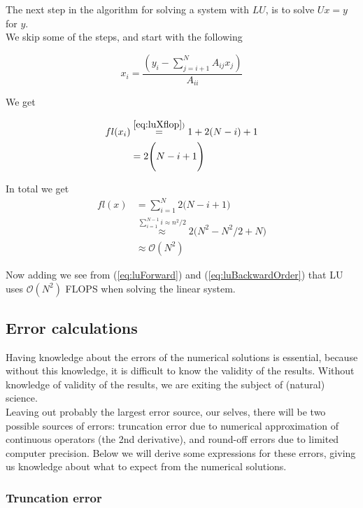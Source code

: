 \documentclass{article}
\begin{document}
The next step in the algorithm for solving a system with $LU$, is to solve $Ux = y$ for $y$.\\

We skip some of the steps, and start with the following

\begin{equation}\label{eq:luXflop}
x_i = \frac{(y_i - \sum_{j=i+1}^N A_{ij} x_j)}{A_{ii}}
\end{equation}

We get

\begin{align}
fl(x_i) & \stackrel{\ref{eq:luXflop})}{=} 1 + 2(N - i) + 1 \\
&= 2\Bigg(N-i + 1 \Bigg)
\end{align}

In total we get
\begin{subequations}
	\begin{align}
	fl(x) &= \sum_{i=1}^N 2\Bigg(N-i + 1 \Bigg)\\
	&\stackrel{\sum_{i=1}^{N-1} i\approx n^2/2}{\approx} 2 \Bigg( N^2 - N^2/2 + N\Bigg)\\
	&\approx \mathcal{O}(N^2)\label{eq:luBackwardOrder}
	\end{align}
\end{subequations}

Now adding we see from (\ref{eq:luForward}) and (\ref{eq:luBackwardOrder}) that LU uses $\mathcal{O}(N^2)$ FLOPS when solving the linear system.

\subsection{Error calculations}
Having knowledge about the errors of the numerical solutions is essential, because without this knowledge, it is difficult to know the validity of the results. Without knowledge of validity of the results, we are exiting the subject of (natural) science. \\

Leaving out probably the largest error source, our selves, there will be two possible sources of errors: truncation error due to numerical approximation of continuous operators (the 2nd derivative), and round-off errors due to limited computer precision. Below we will derive some expressions for these errors, giving us knowledge about what to expect from the numerical solutions.

\subsubsection{Truncation error}
\end{document}
